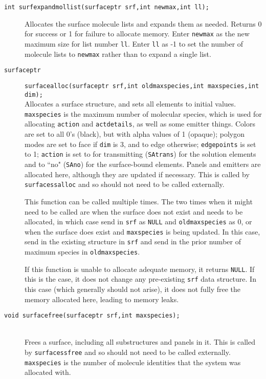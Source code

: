 \documentclass {book}
\begin{document}
\begin{description}
\item[\texttt{int surfexpandmollist(surfaceptr srf,int newmax,int ll);}]
\hfill
Allocates the surface molecule lists and expands them as needed.  Returns 0 for success or 1 for failure to allocate memory.  Enter \texttt{newmax} as the new maximum size for list number \texttt{ll}.  Enter \texttt{ll} as -1 to set the number of molecule lists to \texttt{newmax} rather than to expand a single list.

\item[\texttt{surfaceptr}]
\texttt{surfacealloc(surfaceptr srf,int oldmaxspecies,int maxspecies,int dim);}
\hfill \\
Allocates a surface structure, and sets all elements to initial values.  \texttt{maxspecies} is the maximum number of molecular species, which is used for allocating \texttt{action} and \texttt{actdetails}, as well as some emitter things.  Colors are set to all 0's (black), but with alpha values of 1 (opaque); polygon modes are set to face if \texttt{dim} is 3, and to edge otherwise; \texttt{edgepoints} is set to 1; \texttt{action} is set to for transmitting (\texttt{SAtrans}) for the solution elements and to ``no" (\texttt{SAno}) for the surface-bound elements.  Panels and emitters are allocated here, although they are updated if necessary.  This is called by \texttt{surfacessalloc} and so should not need to be called externally.

This function can be called multiple times.  The two times when it might need to be called are when the surface does not exist and needs to be allocated, in which case send in \texttt{srf} as \texttt{NULL} and \texttt{oldmaxspecies} as 0, or when the surface does exist and \texttt{maxspecies} is being updated.  In this case, send in the existing structure in \texttt{srf} and send in the prior number of maximum species in \texttt{oldmaxspecies}.

If this function is unable to allocate adequate memory, it returns \texttt{NULL}.  If this is the case, it does not change any pre-existing \texttt{srf} data structure.  In this case (which generally should not arise), it does not fully free the memory allocated here, leading to memory leaks.

\item[\texttt{void surfacefree(surfaceptr srf,int maxspecies);}]
\hfill \\
Frees a surface, including all substructures and panels in it.  This is called by \texttt{surfacessfree} and so should not need to be called externally.  \texttt{maxspecies} is the number of molecule identities that the system was allocated with.


\end{description}
\end{document}
